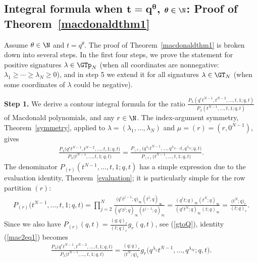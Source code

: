\subsection[Integral formula when $t = q^{\theta}$, $\theta\in\N$: Proof of Theorem~\ref{macdonaldthm1}]{Integral formula when $\boldsymbol{t = q^{\theta}}$, $\boldsymbol{\theta\in\N}$: Proof of Theorem~\ref{macdonaldthm1}}\label{proofthm1macdonald}

Assume $\theta\in\N$ and $t = q^{\theta}$. The proof of Theorem~\ref{macdonaldthm1} is broken down into several steps. In the f\/irst four steps, we prove the statement for positive signatures $\lambda\in\GTp_N$ (when all coordinates are nonnegative: $\lambda_1 \geq \cdots \geq \lambda_N \geq 0$), and in step 5 we extend it for all signatures $\lambda\in\GT_N$ (when some coordinates of $\lambda$ could be negative).

\textbf{Step 1.} We derive a contour integral formula for the ratio $\frac{P_{\lambda}(q^rt^{N-1}, t^{N-2}, \dots, t, 1; q, t)}{P_{\lambda}(t^{N-1}, \dots, t, 1; q, t)}$ of Macdonald polynomials, and any $r\in\N$. The index-argument symmetry, Theorem~\ref{symmetry}, applied to $\lambda = (\lambda_1, \dots, \lambda_N)$ and $\mu = (r) = (r, 0^{N-1})$, gives
\begin{gather}\label{mac2eq1}
\frac{P_{\lambda}\big(q^rt^{N-1}, t^{N-2}, \dots, t, 1; q, t\big)}{P_{\lambda}\big(t^{N-1}, \dots, t, 1; q, t\big)} = \frac{P_{(r)}\big(q^{\lambda_1}t^{N-1}, \dots, q^{\lambda_{N-1}}t, q^{\lambda_N}; q, t\big)}{P_{(r)}\big(t^{N-1}, \dots, t, 1; q, t\big)}.
\end{gather}
The denominator $P_{(r)}(t^{N-1}, \dots, t, 1; q, t)$ has a simple expression due to the evaluation identity, Theorem~\ref{evaluation}; it is particularly simple for the row partition $(r)$:
\begin{gather*}
P_{(r)}\big(t^{N-1}, \dots, t, 1; q, t\big) = \prod_{j=2}^N{\frac{\big(q^{r}t^{j-1}; q\big)_{\infty}(t^j; q)_{\infty}}{(q^rt^j; q)_{\infty}(t^{j-1}; q)_{\infty}}} = {\frac{(q^rt; q)_{\infty}(t^N; q)_{\infty}}{(q^rt^N; q)_{\infty}(t; q)_{\infty}}} = \frac{\big(t^N; q\big)_r}{(t; q)_r}.
\end{gather*}
Since we also have $P_{(r)}(q, t) = \frac{(q; q)_r}{(t; q)_r}g_r(q, t)$, see (\ref{gtoQ}), identity (\ref{mac2eq1}) becomes
\begin{gather}\label{mac2eq0}
\frac{P_{\lambda}\big(q^rt^{N-1}, t^{N-2}, \dots, t, 1; q, t\big)}{P_{\lambda}\big(t^{N-1}, \dots, t, 1; q, t\big)} = \frac{(q; q)_r}{\big(t^N; q\big)_r} g_r\big(q^{\lambda_1}t^{N-1}, \dots, q^{\lambda_N}; q, t\big).
\end{gather}

